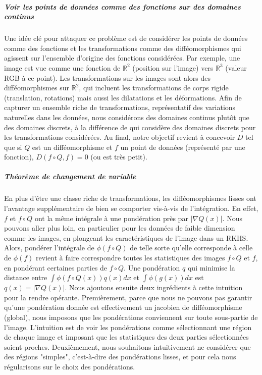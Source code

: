 \subparagraph{Voir les points de données comme des fonctions sur des domaines continus} Une idée clé pour attaquer ce problème est de considérer les points de données comme des fonctions et les transformations comme des difféomorphismes qui agissent sur l'ensemble d'origine des fonctions considérées. Par exemple, une image est vue comme une fonction de $\mathbb R^2$ (position sur l'image) vers $\mathbb R^3$ (valeur RGB à ce point). Les transformations sur les images sont alors des difféomorphismes sur $\mathbb R^2$, qui incluent les transformations de corps rigide (translation, rotations) mais aussi les dilatations et les déformations.
Afin de capturer un ensemble riche de transformations, représentatif des variations naturelles dans les données, nous considérons des domaines continus plutôt que des domaines discrets, à la différence de \cite{bietti} qui considère des domaines discrets pour les transformations considérées.
Au final, notre objectif revient à concevoir $D$ tel que si $Q$ est un difféomorphisme et $f$ un point de données (représenté par une fonction), $D(f\circ Q, f) = 0$ (ou est très petit).

\subparagraph{Théorème de changement de variable}
En plus d'être une classe riche de transformations, les difféomorphismes lisses ont l'avantage supplémentaire de bien se comporter vis-à-vis de l'intégration.
En effet, $f$ et $f \circ Q$ ont la même intégrale à une pondération près par $\vert \nabla Q(x)\vert$. Nous pouvons aller plus loin, en particulier pour les données de faible dimension comme les images, en plongeant les caractéristiques de l'image dans un RKHS. Alors, pondérer l'intégrale de $\phi(f \circ Q)$ de telle sorte qu'elle corresponde à celle de $\phi(f)$ revient à faire correspondre toutes les statistiques des images $f\circ Q$ et $f$, en pondérant certaines parties de $f\circ Q$. Une pondération $q$ qui minimise la distance entre $\int \phi(f\circ Q(x))q(x)dx$ et $\int \phi(g(x))dx$ est $q(x) = \vert \nabla Q(x)\vert$. Nous ajoutons ensuite deux ingrédients à cette intuition pour la rendre opérante. Premièrement, parce que nous ne pouvons pas garantir qu'une pondération donnée est effectivement un jacobien de difféomorphisme (global), nous imposons que les pondérations conviennent sur toute sous-partie de l'image. L'intuition est de voir les pondérations comme sélectionnant une région de chaque image et imposant que les statistiques des deux parties sélectionnées soient proches. Deuxièmement, nous souhaitons intuitivement ne considérer que des régions "simples", c'est-à-dire des pondérations lisses, et pour cela nous régularisons sur le choix des pondérations.

